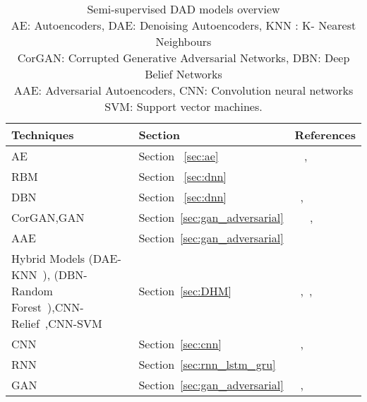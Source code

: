 \begin{table*}
\begin{center}
\caption{Semi-supervised DAD models overview
        \\AE: Autoencoders, DAE: Denoising Autoencoders, KNN : K- Nearest Neighbours
        \\CorGAN: Corrupted Generative Adversarial Networks, DBN: Deep Belief Networks
        \\ AAE: Adversarial Autoencoders, CNN: Convolution neural networks
        \\ SVM:  Support vector machines.}
    \label{tab:semisupervisedModels}
    \begin{tabular}{ | p{4cm} | p{4cm} | p{4cm} |}
    \hline
     \textbf{Techniques}  & \textbf{Section} & \textbf{References} \\ \hline
     AE & Section ~\ref{sec:ae} & ~\cite{edmunds2017deep} ,~\cite{estiri2018semi}\\\hline
     RBM & Section ~\ref{sec:dnn} & ~\cite{jia2014novel} \\\hline
     DBN & Section ~\ref{sec:dnn} & ~\cite{wulsin2010semi},~\cite{wulsin2011modeling} \\\hline
     CorGAN,GAN & Section~\ref{sec:gan_adversarial} & ~\cite{gu2018semi} ~\cite{akcay2018ganomaly},~\cite{sabokrou2018adversarially}\\\hline
     AAE &Section~\ref{sec:gan_adversarial} & ~\cite{dimokranitou2017adversarial}\\\hline
     Hybrid Models (DAE-KNN~\cite{altman1992introduction}), (DBN-Random Forest~\cite{ho1995random}),CNN-Relief~\cite{kira1992feature},CNN-SVM~\cite{cortes1995support} & Section~\ref{sec:DHM} & ~\cite{song2017hybrid},~\cite{shi2017semi},~\cite{zhu2018hybrid} \\\hline
     CNN & Section~\ref{sec:cnn} & ~\cite{racah2017extremeweather},~\cite{perera2018learning} \\ \hline
     RNN & Section~\ref{sec:rnn_lstm_gru} & ~\cite{wu2018semi} \\ \hline
     GAN & Section~\ref{sec:gan_adversarial} & ~\cite{kliger2018novelty},~\cite{gu2018semi} \\ \hline
    \end{tabular}
\end{center}
\end{table*}



